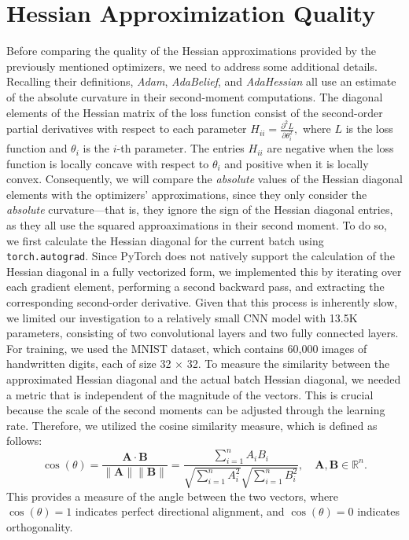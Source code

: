 \section{Hessian Approximization Quality}
Before comparing the quality of the Hessian approximations provided by the previously mentioned optimizers,
 we need to address some additional details.
Recalling their definitions, \emph{Adam}, \emph{AdaBelief}, and \emph{AdaHessian} all use an estimate of the
absolute curvature in their second-moment computations.
The diagonal elements of the Hessian matrix of the loss function consist of the second-order partial derivatives with respect to each parameter $H_{ii} = \frac{\partial^2 L}{\partial \theta_i^2},$
where \( L \) is the loss function and \( \theta_i \) is the \( i \)-th parameter.
The entries \( H_{ii} \) are negative when the loss function is locally concave with respect to \( \theta_i \) and positive when it is locally convex.
Consequently, we will compare the \emph{absolute} values of the Hessian diagonal elements with the optimizers' approximations,
 since they only consider the \emph{absolute} curvature—that is, they ignore the sign of the Hessian diagonal entries, 
 as they all use the squared approaximations in their second moment.
To do so, we first calculate the Hessian diagonal for the current batch using \texttt{torch.autograd}.
Since PyTorch does not natively support the calculation of the Hessian diagonal in a fully vectorized form,
we implemented this by iterating over each gradient element, performing a second backward pass, and extracting the corresponding second-order derivative.
Given that this process is inherently slow, we limited our investigation to a relatively small CNN model with 13.5K parameters, consisting of two convolutional layers and two fully connected layers.
For training, we used the MNIST dataset, which contains 60,000 images of handwritten digits, each of size 32 $\times$ 32.
To measure the similarity between the approximated Hessian diagonal and the actual batch Hessian diagonal, we needed a metric that is independent of the magnitude of the vectors.
This is crucial because the scale of the second moments can be adjusted through the learning rate.
Therefore, we utilized the cosine similarity measure, which is defined as follows:
\[
\cos(\theta) = \frac{\mathbf{A} \cdot \mathbf{B}}{\|\mathbf{A}\| \|\mathbf{B}\|} = \frac{\sum_{i=1}^{n} A_i B_i}{\sqrt{\sum_{i=1}^{n} A_i^2} \sqrt{\sum_{i=1}^{n} B_i^2}}, \quad \mathbf{A}, \mathbf{B} \in \mathbb{R}^n.
\]
This provides a measure of the angle between the two vectors, where \( \cos(\theta) = 1 \) indicates perfect directional alignment, and \( \cos(\theta) = 0 \) indicates orthogonality.
